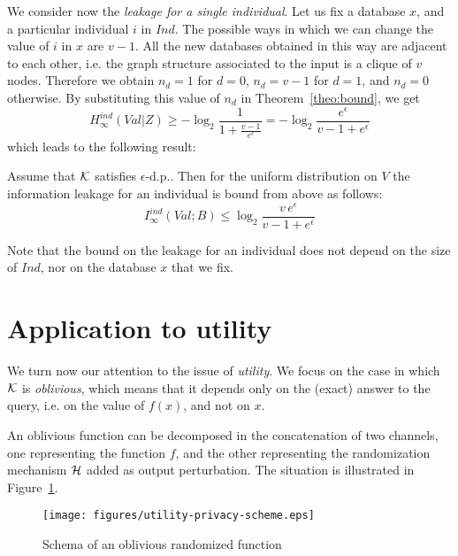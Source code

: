 \documentclass{llncs}
\begin{document}
We consider now the \emph{leakage for a single individual}. Let us fix a database $x$, and a particular individual $i$ in $\mathit{Ind}$. The  possible ways in which we can change the value of $i$ in 
$x$ are $v-1$. All the new databases obtained in this way are adjacent to each other, i.e. the graph structure associated to the input is a clique of $v$ nodes. 
Therefore we obtain $n_d=1$ for $d=0$, $n_d= v-1$ for $d=1$, and $n_d=0$ otherwise. 
By substituting this value of $n_d$ in Theorem~\ref{theo:bound}, we get
\[
H^{ind}_\infty(\mathit{Val}|Z) \geq - \log_2 \frac{1}{\displaystyle  1 +   \frac{v-1}{e^{\epsilon}}}  = - \log_2\frac{e^\epsilon}{v-1 + e^\epsilon}
\]
which leads to the following result:
\begin{proposition}\label{prop:ind}
Assume that $\cal K$ satisfies $\epsilon$-d.p.. Then for the uniform distribution on $\mathit V$ the information leakage for an individual is bound from above as  follows: 
\[
I^{ind}_\infty(\mathit{Val};B)\leq  \log_2\frac{v\,e^{\epsilon}}{v-1+e^\epsilon}
\]
\end{proposition}
Note  that the bound on the leakage for an individual does not depend on the size of $\mathit{Ind}$, nor on the database $x$ that we fix.
		
\section{Application to utility}
\label{sec:utility}
We turn now our attention to the issue of \emph{utility}. We focus on the case in which $\cal K$ is \emph{oblivious}, which means that it depends only on the (exact) answer to the query, i.e. on the value of $f(x)$, and not on $x$.  
 
An oblivious  function can be decomposed in the concatenation of two channels, one representing the function $f$, and the other representing the randomization mechanism $\cal H$ 
added  as output perturbation. The situation is illustrated in Figure~\ref{fig:ut-leak-scheme}. 

\begin{figure}[t]\centering
		\texttt{[image: figures/utility-privacy-scheme.eps]}\caption{Schema of an oblivious randomized function}\label{fig:ut-leak-scheme}\end{figure}
\end{document}

